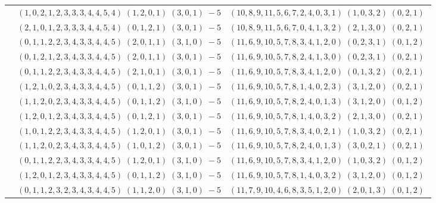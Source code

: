 \documentclass[11pt]{article}
\begin{document}
\begin{longtable}[l]{|c|c|c|}
 \cline{2-3} 
 & $(1 ,0 ,2 ,1 ,2 ,3 ,3 ,3 ,4 ,4 ,5 ,4) \;(1 ,2 ,0 ,1) \;(3 ,0 ,1) \;-5$ & $(10 ,8 ,9 ,11 ,5 ,6 ,7 ,2 ,4 ,0 ,3 ,1) \;(1 ,0 ,3 ,2) \;(0 ,2 ,1) \;$\\ 
 \cline{2-3} 
 & $(2 ,1 ,0 ,1 ,2 ,3 ,3 ,3 ,4 ,4 ,5 ,4) \;(0 ,1 ,2 ,1) \;(3 ,0 ,1) \;-5$ & $(10 ,8 ,9 ,11 ,5 ,6 ,7 ,0 ,4 ,1 ,3 ,2) \;(2 ,1 ,3 ,0) \;(0 ,2 ,1) \;$\\ 
 \cline{2-3} 
 & $(0 ,1 ,1 ,2 ,2 ,3 ,4 ,3 ,3 ,4 ,4 ,5) \;(2 ,0 ,1 ,1) \;(3 ,1 ,0) \;-5$ & $(11 ,6 ,9 ,10 ,5 ,7 ,8 ,3 ,4 ,1 ,2 ,0) \;(0 ,2 ,3 ,1) \;(0 ,1 ,2) \;$\\ 
 \cline{2-3} 
 & $(0 ,1 ,2 ,1 ,2 ,3 ,4 ,3 ,3 ,4 ,4 ,5) \;(2 ,0 ,1 ,1) \;(3 ,0 ,1) \;-5$ & $(11 ,6 ,9 ,10 ,5 ,7 ,8 ,2 ,4 ,1 ,3 ,0) \;(0 ,2 ,3 ,1) \;(0 ,2 ,1) \;$\\ 
 \cline{2-3} 
 & $(0 ,1 ,1 ,2 ,2 ,3 ,4 ,3 ,3 ,4 ,4 ,5) \;(2 ,1 ,0 ,1) \;(3 ,0 ,1) \;-5$ & $(11 ,6 ,9 ,10 ,5 ,7 ,8 ,3 ,4 ,1 ,2 ,0) \;(0 ,1 ,3 ,2) \;(0 ,2 ,1) \;$\\ 
 \cline{2-3} 
 & $(1 ,2 ,1 ,0 ,2 ,3 ,4 ,3 ,3 ,4 ,4 ,5) \;(0 ,1 ,1 ,2) \;(3 ,0 ,1) \;-5$ & $(11 ,6 ,9 ,10 ,5 ,7 ,8 ,1 ,4 ,0 ,2 ,3) \;(3 ,1 ,2 ,0) \;(0 ,2 ,1) \;$\\ 
 \cline{2-3} 
 & $(1 ,1 ,2 ,0 ,2 ,3 ,4 ,3 ,3 ,4 ,4 ,5) \;(0 ,1 ,1 ,2) \;(3 ,1 ,0) \;-5$ & $(11 ,6 ,9 ,10 ,5 ,7 ,8 ,2 ,4 ,0 ,1 ,3) \;(3 ,1 ,2 ,0) \;(0 ,1 ,2) \;$\\ 
 \cline{2-3} 
 & $(1 ,2 ,0 ,1 ,2 ,3 ,4 ,3 ,3 ,4 ,4 ,5) \;(0 ,1 ,2 ,1) \;(3 ,0 ,1) \;-5$ & $(11 ,6 ,9 ,10 ,5 ,7 ,8 ,1 ,4 ,0 ,3 ,2) \;(2 ,1 ,3 ,0) \;(0 ,2 ,1) \;$\\ 
 \cline{2-3} 
 & $(1 ,0 ,1 ,2 ,2 ,3 ,4 ,3 ,3 ,4 ,4 ,5) \;(1 ,2 ,0 ,1) \;(3 ,0 ,1) \;-5$ & $(11 ,6 ,9 ,10 ,5 ,7 ,8 ,3 ,4 ,0 ,2 ,1) \;(1 ,0 ,3 ,2) \;(0 ,2 ,1) \;$\\ 
 \cline{2-3} 
 & $(1 ,1 ,2 ,0 ,2 ,3 ,4 ,3 ,3 ,4 ,4 ,5) \;(1 ,0 ,1 ,2) \;(3 ,0 ,1) \;-5$ & $(11 ,6 ,9 ,10 ,5 ,7 ,8 ,2 ,4 ,0 ,1 ,3) \;(3 ,0 ,2 ,1) \;(0 ,2 ,1) \;$\\ 
 \cline{2-3} 
 & $(0 ,1 ,1 ,2 ,2 ,3 ,4 ,3 ,3 ,4 ,4 ,5) \;(1 ,2 ,0 ,1) \;(3 ,1 ,0) \;-5$ & $(11 ,6 ,9 ,10 ,5 ,7 ,8 ,3 ,4 ,1 ,2 ,0) \;(1 ,0 ,3 ,2) \;(0 ,1 ,2) \;$\\ 
 \cline{2-3} 
 & $(1 ,2 ,0 ,1 ,2 ,3 ,4 ,3 ,3 ,4 ,4 ,5) \;(0 ,1 ,1 ,2) \;(3 ,1 ,0) \;-5$ & $(11 ,6 ,9 ,10 ,5 ,7 ,8 ,1 ,4 ,0 ,3 ,2) \;(3 ,1 ,2 ,0) \;(0 ,1 ,2) \;$\\ 
 \cline{2-3} 
 & $(0 ,1 ,1 ,2 ,3 ,2 ,3 ,4 ,3 ,4 ,4 ,5) \;(1 ,1 ,2 ,0) \;(3 ,1 ,0) \;-5$ & $(11 ,7 ,9 ,10 ,4 ,6 ,8 ,3 ,5 ,1 ,2 ,0) \;(2 ,0 ,1 ,3) \;(0 ,1 ,2) \;$\\ 

\end{longtable}
\end{document}
